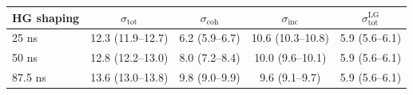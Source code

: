 \begin{tabular}{lcccc}
\toprule
HG shaping & $\sigma_\mathrm{tot}$ & $\sigma_\mathrm{coh}$ & $\sigma_\mathrm{inc}$ & $\sigma_\mathrm{tot}^\mathrm{LG}$ \\
\midrule
25 ns & 12.3 (11.9--12.7) & 6.2 (5.9--6.7) & 10.6 (10.3--10.8) & 5.9 (5.6--6.1) \\
50 ns & 12.8 (12.2--13.0) & 8.0 (7.2--8.4) & 10.0 (9.6--10.1) & 5.9 (5.6--6.1) \\
87.5 ns & 13.6 (13.0--13.8) & 9.8 (9.0--9.9) & 9.6 (9.1--9.7) & 5.9 (5.6--6.1) \\
\bottomrule
\end{tabular}
